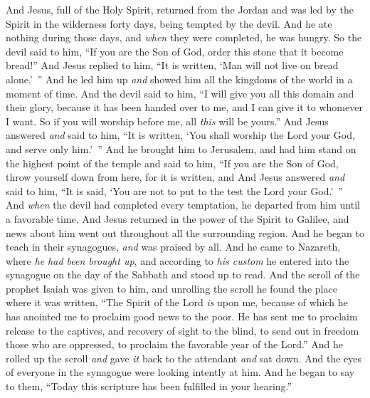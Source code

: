 \begin{biblechapter} %
 And Jesus, full of the Holy Spirit, returned from the Jordan and was led by the Spirit in the wilderness
\verse forty days, being tempted by the devil. And he ate nothing during those days, and \textit{when} they were completed, he was hungry.
\verse So the devil said to him, “If you are the Son of God, order this stone that it become bread!”
\verse And Jesus replied to him, “It is written, ‘Man will not live on bread alone.’ ”
\verse And he led him up \textit{and} showed him all the kingdoms of the world in a moment of time.
\verse And the devil said to him, “I will give you all this domain and their glory, because it has been handed over to me, and I can give it to whomever I want.
\verse So if you will worship before me, all \textit{this} will be yours.”
\verse And Jesus answered \textit{and} said to him, “It is written, ‘You shall worship the Lord your God, and serve only him.’ ”
\verse And he brought him to Jerusalem, and had him stand on the highest point of the temple and said to him, “If you are the Son of God, throw yourself down from here,
\verse for it is written,
\verse and
\verse And Jesus answered \textit{and} said to him, “It is said, ‘You are not to put to the test the Lord your God.’ ”
\verse And \textit{when} the devil had completed every temptation, he departed from him until a favorable time.
 And Jesus returned in the power of the Spirit to Galilee, and news about him went out throughout all the surrounding region.
\verse And he began to teach in their synagogues, \textit{and} was praised by all.
 And he came to Nazareth, where \textit{he had been brought up}, and according to \textit{his custom} he entered into the synagogue on the day of the Sabbath and stood up to read.
\verse And the scroll of the prophet Isaiah was given to him, and unrolling the scroll he found the place where it was written,
\verse “The Spirit of the Lord \textit{is} upon me, 
because of which he has anointed me 
to proclaim good news to the poor. 
He has sent me 
to proclaim release to the captives, 
and recovery of sight to the blind, 
to send out in freedom those who are oppressed,
\verse to proclaim the favorable year of the Lord.”
\verse And he rolled up the scroll \textit{and} gave \textit{it} back to the attendant \textit{and} sat down. And the eyes of everyone in the synagogue were looking intently at him.
\verse And he began to say to them, “Today this scripture has been fulfilled in your hearing.”

\end{biblechapter}
